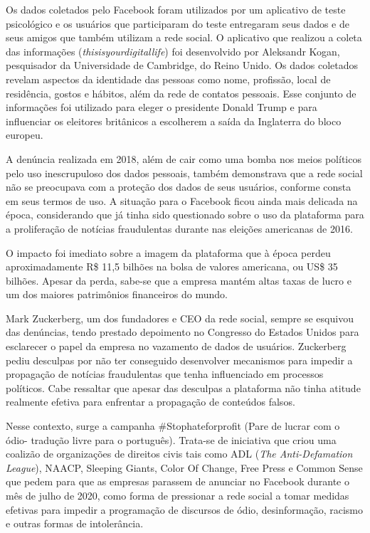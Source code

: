 Os dados coletados pelo Facebook foram utilizados por um aplicativo de
teste psicológico e os usuários que participaram do teste entregaram
seus dados e de seus amigos que também utilizam a rede social. O
aplicativo que realizou a coleta das
informações (\emph{thisisyourdigitallife}) foi desenvolvido por
Aleksandr Kogan, pesquisador da Universidade de Cambridge, do Reino
Unido. Os dados coletados revelam aspectos da identidade das pessoas
como nome, profissão, local de residência, gostos e hábitos, além da
rede de contatos pessoais. Esse conjunto de informações foi utilizado
para eleger o presidente Donald Trump e para influenciar os eleitores
britânicos a escolherem a saída da Inglaterra do bloco europeu.

A denúncia realizada em 2018, além de cair como uma bomba nos meios
políticos pelo uso inescrupuloso dos dados pessoais, também demonstrava
que a rede social não se preocupava com a proteção dos dados de seus
usuários, conforme consta em seus termos de uso. A situação para o
Facebook ficou ainda mais delicada na época, considerando que já tinha
sido questionado sobre o uso da plataforma para a proliferação de
notícias fraudulentas durante nas eleições americanas de 2016.

O impacto foi imediato sobre a imagem da plataforma que à época perdeu
aproximadamente R\$ 11,5 bilhões na bolsa de valores americana, ou US\$
35 bilhões. Apesar da perda, sabe-se que a empresa mantém altas taxas de
lucro e um dos maiores patrimônios financeiros do mundo.

Mark Zuckerberg, um dos fundadores e CEO da rede social, sempre se
esquivou das denúncias, tendo prestado depoimento no Congresso do
Estados Unidos para esclarecer o papel da empresa no vazamento de dados
de usuários. Zuckerberg pediu desculpas por não ter conseguido
desenvolver mecanismos para impedir a propagação de notícias
fraudulentas que tenha influenciado em processos políticos. Cabe
ressaltar que apesar das desculpas a plataforma não tinha atitude
realmente efetiva para enfrentar a propagação de conteúdos falsos.

Nesse contexto, surge a campanha \#Stophateforprofit (Pare de lucrar com
o ódio- tradução livre para o português). Trata-se de iniciativa que
criou uma coalizão de organizações de direitos civis tais como ADL
(\emph{The Anti-Defamation League}), NAACP, Sleeping Giants, Color Of
Change, Free Press e Common Sense que pedem para que as empresas
parassem de anunciar no Facebook durante o mês de julho de 2020, como
forma de pressionar a rede social a tomar medidas efetivas para impedir
a programação de discursos de ódio, desinformação, racismo e outras
formas de intolerância.

